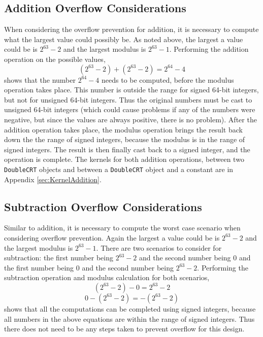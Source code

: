 \subsection{Addition Overflow Considerations}
When considering the overflow prevention for addition, it is necessary to compute what the largest value could possibly be. As noted above, the largest a value could be is $2^{63} - 2$ and the largest modulus is $2^{63} - 1$. Performing the addition operation on the possible values, 
\begin{equation} \label{eq:add}
(2^{63} - 2) + (2^{63} - 2) = 2^{64} - 4
\end{equation}
shows that the number $2^{64} - 4$ needs to be computed, before the modulus operation takes place. This number is outside the range for signed 64-bit integers, but not for unsigned 64-bit integers. Thus the original numbers must be cast to unsigned 64-bit integers (which could cause problems if any of the numbers were negative, but since the values are always positive, there is no problem). After the addition operation takes place, the modulus operation brings the result back down the the range of signed integers, because the modulus is in the range of signed integers. The result is then finally cast back to a signed integer, and the operation is complete. The kernels for both addition operations, between two \verb|DoubleCRT| objects and between a \verb|DoubleCRT| object and a constant are in Appendix 
\ref{sec:KernelAddition}.

\subsection{Subtraction Overflow Considerations}
Similar to addition, it is necessary to compute the worst case scenario when considering overflow prevention. Again the largest a value could be is $2^{63} - 2$ and the largest modulus is $2^{63} - 1$. There are two scenarios to consider for subtraction: the first number being $2^{63} - 2$ and the second number being 0 and the first number being 0 and the second number being $2^{63} - 2$. Performing the subtraction operation and modulus calculation for both scenarios,
\begin{equation} \label{eq:sub1}
(2^{63} - 2) - 0 = 2^{63} - 2
\end{equation}
\begin{equation} \label{eq:sub2}
0 - (2^{63} - 2) = -(2^{63} - 2)
\end{equation}
shows that all the computations can be completed using signed integers, because all numbers in the above equations are within the range of signed integers. Thus there does not need to be any steps taken to prevent overflow for this design. 

